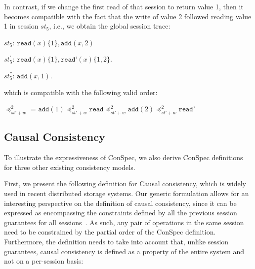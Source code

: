 \documentclass[journal, compsoc]{IEEEtran}
\begin{document}
	In contrast, if we change the first read of that session to return  value 1, then it becomes compatible with the fact that the write of value 2 followed reading value 1 in session $\mathit{st}_5$, i.e., we obtain the global session trace:
	
	$\mathit{st}_5$: $\texttt{read}(x){\{1\}},\texttt{add}(x,2)$
	
	$\mathit{st}_5^{'}$: $\texttt{read}(x){\{1\}},\texttt{read'}(x){\{1,2\}}$.
	
	$\mathit{st}_5^{''}$: $\texttt{add}(x,1)$.
	
	which is compatible with the following valid order:
	
	\noindent $\preccurlyeq_{\mathit{st'}+w}^2$ = $\texttt{add}(1) \preccurlyeq_{\mathit{st'}+w}^2 \texttt{read}
	\preccurlyeq_{\mathit{st'}+w}^2  \texttt{add}(2) \preccurlyeq_{\mathit{st'}+w}^2 \texttt{read'}$
	
	\subsection{Causal Consistency}
	
	 To illustrate the expressiveness of ConSpec, we also derive ConSpec definitions for three other existing consistency models.
	
	First, we present the following definition for Causal consistency, which is widely used in recent distributed storage systems.
	Our generic formulation allows for an interesting perspective on the definition of causal consistency, since it can be expressed as encompassing the constraints defined by all the previous session guarantees for all sessions~\cite{Ahamad:1993:PPC:165231.165264}. %
	 As such, any pair of operations in the same session need to be constrained by the partial order of the ConSpec definition. Furthermore, the definition needs to take into account that, unlike session guarantees, causal consistency is  defined as a property of the entire system and not on a per-session basis:
	
\end{document}
